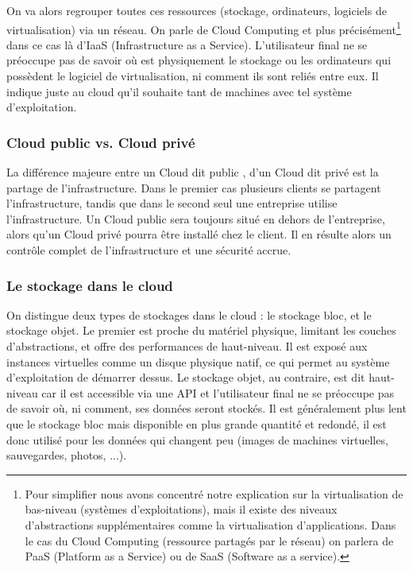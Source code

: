 \documentclass{report}
\begin{document}
On va alors regrouper toutes ces ressources (stockage, ordinateurs, logiciels de virtualisation) via un réseau. On parle de Cloud Computing et plus précisément\footnote{Pour simplifier nous avons concentré notre explication sur la virtualisation de bas-niveau (systèmes d’exploitations), mais il existe des niveaux d’abstractions supplémentaires comme la virtualisation d’applications. Dans le cas du Cloud Computing (ressource partagés par le réseau) on parlera de PaaS (Platform as a Service) ou de SaaS (Software as a service).} dans ce cas là d’IaaS (Infrastructure as a Service).
L’utilisateur final ne se préoccupe pas de savoir où est physiquement le stockage ou les ordinateurs qui possèdent le logiciel de virtualisation, ni comment ils sont reliés entre eux. Il indique juste au cloud qu’il souhaite tant de machines avec tel système d’exploitation.

\subsubsection{Cloud public vs. Cloud privé}
La différence majeure entre un Cloud dit \og public \fg, d'un Cloud dit \og privé \fg est la partage de l'infrastructure. Dans le premier cas plusieurs clients se partagent l'infrastructure, tandis que dans le second seul une entreprise utilise l'infrastructure.\newline
Un Cloud public sera toujours situé en dehors de l'entreprise, alors qu'un Cloud privé pourra être installé chez le client. Il en résulte alors un contrôle complet de l'infrastructure et une sécurité accrue.

\subsubsection{Le stockage dans le cloud}
On distingue deux types de stockages dans le cloud : le stockage bloc, et le stockage objet. Le premier est proche du matériel physique, limitant les couches d'abstractions, et offre des performances de haut-niveau. Il est exposé aux instances virtuelles comme un disque physique natif, ce qui permet au système d'exploitation de démarrer dessus.\newline
Le stockage objet, au contraire, est dit \og haut-niveau \fg car il est accessible via une API et l'utilisateur final ne se préoccupe pas de savoir où, ni comment, ses données seront stockés. Il est généralement plus lent que le stockage bloc mais disponible en plus grande quantité et redondé, il est donc utilisé pour les données qui changent peu (images de machines virtuelles, sauvegardes, photos, ...).
\end{document}

